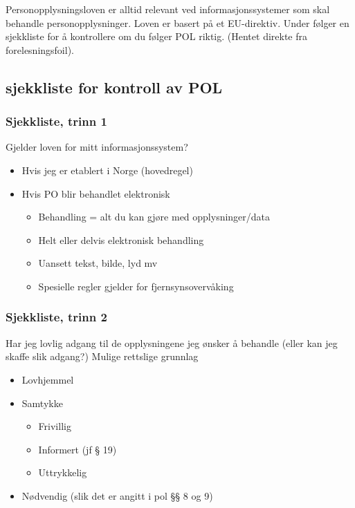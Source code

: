 \documentclass[11pt]{article}
\begin{document}
  Personopplysningsloven er alltid relevant ved informasjonssystemer som skal behandle personopplysninger. Loven er basert på et EU-direktiv. Under følger en sjekkliste for å kontrollere om du følger POL riktig. (Hentet direkte fra forelesningsfoil).
\subsection{sjekkliste for kontroll av POL}
\label{sec-17.1}
\subsubsection{Sjekkliste, trinn 1}
\label{sec-17.1.1}

    Gjelder loven for mitt informasjonssystem? 
\begin{itemize}
\item Hvis jeg er etablert i Norge (hovedregel)
\item Hvis PO blir behandlet elektronisk

\begin{itemize}
\item Behandling = alt du kan gjøre med opplysninger/data
\item Helt eller delvis elektronisk behandling
\item Uansett tekst, bilde, lyd mv
\item Spesielle regler gjelder for fjernsynsovervåking
\end{itemize}

\end{itemize}
\subsubsection{Sjekkliste, trinn 2}
\label{sec-17.1.2}

    Har jeg lovlig adgang til de opplysningene jeg ønsker å behandle (eller kan jeg skaffe slik adgang?)
    Mulige rettslige grunnlag 
\begin{itemize}
\item Lovhjemmel
\item Samtykke

\begin{itemize}
\item Frivillig
\item Informert (jf § 19)
\item Uttrykkelig
\end{itemize}

\item Nødvendig (slik det er angitt i pol §§ 8 og 9)
\end{itemize}
\end{document}

